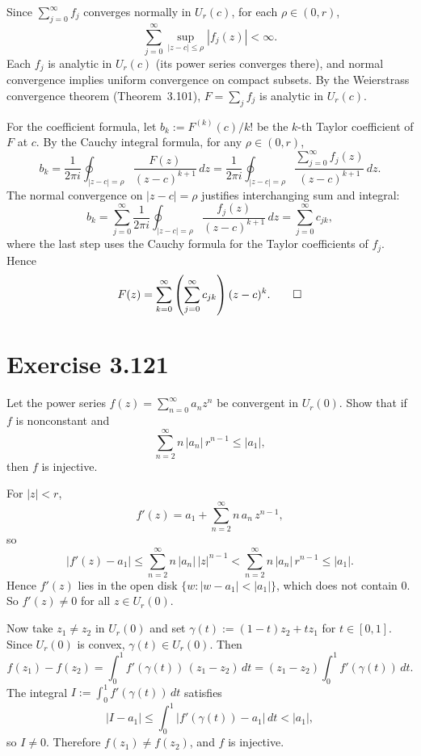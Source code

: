 \documentclass{article}
\begin{document}
\begin{solution}
  Since $\sum_{j=0}^{\infty} f_j$ converges normally in $U_r(c)$,
  for each $\rho \in (0,r)$,
  \[
    \sum_{j=0}^{\infty} \sup_{|z-c|\le\rho}|f_j(z)| < \infty.
  \]
  Each $f_j$ is analytic in $U_r(c)$ (its power series converges
  there), and normal convergence implies uniform convergence on
  compact subsets.
  By the Weierstrass convergence theorem (Theorem~3.101),
  $F = \sum_j f_j$ is analytic in $U_r(c)$.

  For the coefficient formula, let
  $b_k := F^{(k)}(c)/k!$ be the $k$-th Taylor coefficient of $F$
  at $c$.
  By the Cauchy integral formula, for any $\rho \in (0,r)$,
  \[
    b_k = \frac{1}{2\pi i}\oint_{|z-c|=\rho}
    \frac{F(z)}{(z-c)^{k+1}}\,dz
    = \frac{1}{2\pi i}\oint_{|z-c|=\rho}
    \frac{\sum_{j=0}^{\infty} f_j(z)}{(z-c)^{k+1}}\,dz.
  \]
  The normal convergence on $|z-c| = \rho$ justifies interchanging
  sum and integral:
  \[
    b_k = \sum_{j=0}^{\infty}
    \frac{1}{2\pi i}\oint_{|z-c|=\rho}
    \frac{f_j(z)}{(z-c)^{k+1}}\,dz
    = \sum_{j=0}^{\infty} c_{jk},
  \]
  where the last step uses the Cauchy formula for the Taylor
  coefficients of $f_j$.
  Hence
  \[
    F(z) = \sum_{k=0}^{\infty}
    \left(\sum_{j=0}^{\infty} c_{jk}\right)(z-c)^k.\qedhere
  \]
\end{solution}

\section{Exercise 3.121}

Let the power series $f(z) = \sum_{n=0}^{\infty} a_n z^n$
be convergent in $U_r(0)$.
Show that if $f$ is nonconstant and
\[
  \sum_{n=2}^{\infty} n\,|a_n|\,r^{n-1} \le |a_1|,
\]
then $f$ is injective.

\begin{solution}
  For $|z| < r$,
  \[
    f'(z) = a_1 + \sum_{n=2}^{\infty} n\,a_n\,z^{n-1},
  \]
  so
  \[
    |f'(z) - a_1|
    \le \sum_{n=2}^{\infty} n\,|a_n|\,|z|^{n-1}
    < \sum_{n=2}^{\infty} n\,|a_n|\,r^{n-1}
    \le |a_1|.
  \]
  Hence $f'(z)$ lies in the open disk
  $\{w : |w - a_1| < |a_1|\}$, which does not contain $0$.
  So $f'(z) \ne 0$ for all $z \in U_r(0)$.

  Now take $z_1 \ne z_2$ in $U_r(0)$ and set
  $\gamma(t) := (1-t)z_2 + tz_1$ for $t \in [0,1]$.
  Since $U_r(0)$ is convex, $\gamma(t) \in U_r(0)$.
  Then
  \[
    f(z_1) - f(z_2)
    = \int_0^1 f'(\gamma(t))\,(z_1 - z_2)\,dt
    = (z_1 - z_2)\int_0^1 f'(\gamma(t))\,dt.
  \]
  The integral $I := \int_0^1 f'(\gamma(t))\,dt$ satisfies
  \[
    |I - a_1|
    \le \int_0^1 |f'(\gamma(t)) - a_1|\,dt
    < |a_1|,
  \]
  so $I \ne 0$.
  Therefore $f(z_1) \ne f(z_2)$, and $f$ is injective.\qedhere
\end{solution}
\end{document}
